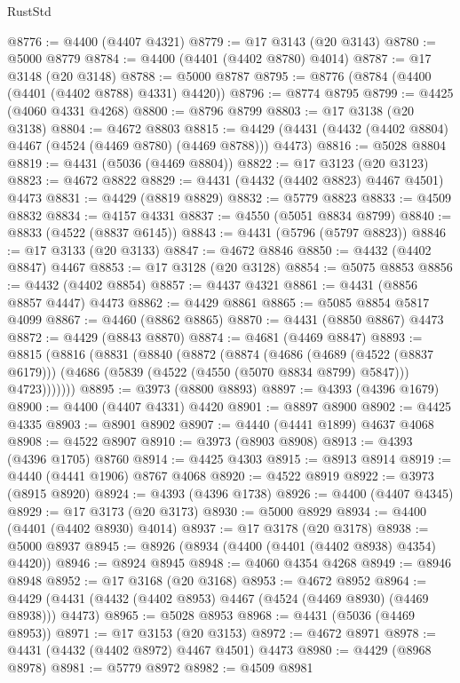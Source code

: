 \begin{lexlean}{RustStd}
\begin{coremodule}
@8776 := @4400 (@4407 @4321)
@8779 := @17 @3143 (@20 @3143)
@8780 := @5000 @8779
@8784 := @4400 (@4401 (@4402 @8780) @4014)
@8787 := @17 @3148 (@20 @3148)
@8788 := @5000 @8787
@8795 := @8776 (@8784 (@4400 (@4401 (@4402 @8788) @4331) @4420))
@8796 := @8774 @8795
@8799 := @4425 (@4060 @4331 @4268)
@8800 := @8796 @8799
@8803 := @17 @3138 (@20 @3138)
@8804 := @4672 @8803
@8815 := @4429 (@4431 (@4432 (@4402 @8804) @4467 (@4524 (@4469 @8780) (@4469 @8788))) @4473)
@8816 := @5028 @8804
@8819 := @4431 (@5036 (@4469 @8804))
@8822 := @17 @3123 (@20 @3123)
@8823 := @4672 @8822
@8829 := @4431 (@4432 (@4402 @8823) @4467 @4501) @4473
@8831 := @4429 (@8819 @8829)
@8832 := @5779 @8823
@8833 := @4509 @8832
@8834 := @4157 @4331
@8837 := @4550 (@5051 @8834 @8799)
@8840 := @8833 (@4522 (@8837 @6145))
@8843 := @4431 (@5796 (@5797 @8823))
@8846 := @17 @3133 (@20 @3133)
@8847 := @4672 @8846
@8850 := @4432 (@4402 @8847) @4467
@8853 := @17 @3128 (@20 @3128)
@8854 := @5075 @8853
@8856 := @4432 (@4402 @8854)
@8857 := @4437 @4321
@8861 := @4431 (@8856 @8857 @4447) @4473
@8862 := @4429 @8861
@8865 := @5085 @8854 @5817 @4099
@8867 := @4460 (@8862 @8865)
@8870 := @4431 (@8850 @8867) @4473
@8872 := @4429 (@8843 @8870)
@8874 := @4681 (@4469 @8847)
@8893 := @8815
    (@8816
      (@8831
        (@8840
          (@8872
            (@8874
              (@4686
                (@4689 (@4522 (@8837 @6179)))
                (@4686 (@5839 (@4522 (@4550 (@5070 @8834 @8799) @5847))) @4723)))))))
@8895 := @3973 (@8800 @8893)
@8897 := @4393 (@4396 @1679)
@8900 := @4400 (@4407 @4331) @4420
@8901 := @8897 @8900
@8902 := @4425 @4335
@8903 := @8901 @8902
@8907 := @4440 (@4441 @1899) @4637 @4068
@8908 := @4522 @8907
@8910 := @3973 (@8903 @8908)
@8913 := @4393 (@4396 @1705) @8760
@8914 := @4425 @4303
@8915 := @8913 @8914
@8919 := @4440 (@4441 @1906) @8767 @4068
@8920 := @4522 @8919
@8922 := @3973 (@8915 @8920)
@8924 := @4393 (@4396 @1738)
@8926 := @4400 (@4407 @4345)
@8929 := @17 @3173 (@20 @3173)
@8930 := @5000 @8929
@8934 := @4400 (@4401 (@4402 @8930) @4014)
@8937 := @17 @3178 (@20 @3178)
@8938 := @5000 @8937
@8945 := @8926 (@8934 (@4400 (@4401 (@4402 @8938) @4354) @4420))
@8946 := @8924 @8945
@8948 := @4060 @4354 @4268
@8949 := @8946 @8948
@8952 := @17 @3168 (@20 @3168)
@8953 := @4672 @8952
@8964 := @4429 (@4431 (@4432 (@4402 @8953) @4467 (@4524 (@4469 @8930) (@4469 @8938))) @4473)
@8965 := @5028 @8953
@8968 := @4431 (@5036 (@4469 @8953))
@8971 := @17 @3153 (@20 @3153)
@8972 := @4672 @8971
@8978 := @4431 (@4432 (@4402 @8972) @4467 @4501) @4473
@8980 := @4429 (@8968 @8978)
@8981 := @5779 @8972
@8982 := @4509 @8981

\end{coremodule}
\end{lexlean}

